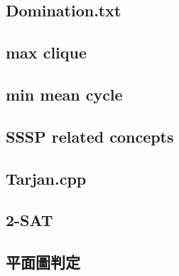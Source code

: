 	\subsection{Domination.txt}
		
%		
%		
%		
	\subsection{max clique}
		
	\subsection{min mean cycle}
		
%		
%		
	\subsection{SSSP related concepts}
		
	\subsection{Tarjan.cpp}
		
	\subsection{2-SAT}
		
	\subsection{平面圖判定}
		


